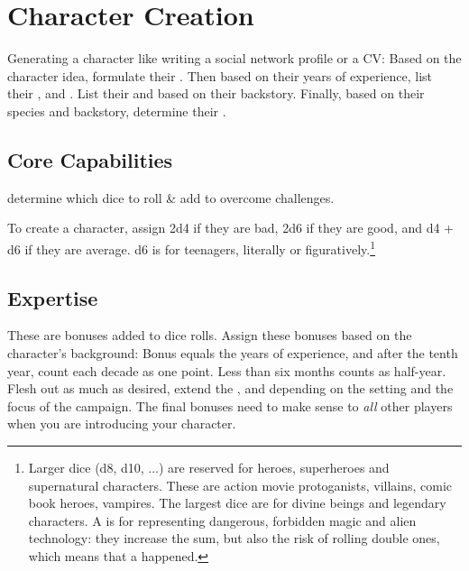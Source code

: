 \documentclass{LegrandOrangeTufteBook}
\begin{document}
\chapterspaceabove{2.75cm}
\chapterspacebelow{5.25cm}


\chapter*{Character Creation}

Generating a character like writing a social network profile or a CV: Based on the character idea, formulate their .
Then based on their years of experience, list their ,  and .
List their  and  based on their backstory.
Finally, based on their species and backstory, determine their .

\section*{Core Capabilities}

 determine which dice to roll \& add to overcome challenges.


To create a  character,
\marginpar{
	\footnotesize
	
}
assign 2d4 if they are bad,
2d6 if they are good, and d4 + d6 if they are average.
d6 is for teenagers, literally or figuratively.\footnote{
 	Larger dice (d8, d10, ...) are reserved for heroes, superheroes and supernatural characters.
 	These are action movie protoganists, villains, comic book heroes, vampires.
 	The largest dice are for divine beings and legendary characters.
 	A  is for representing dangerous, forbidden magic and alien technology:
 	they increase the sum, but also the risk of rolling double ones, which means that a  happened.
}

\section*{Expertise}

These are bonuses added to dice rolls. Assign these bonuses based on the character's background: Bonus equals the years of experience, and after the tenth year, count each decade as one point. Less than six months counts as half-year. Flesh out as much as desired, extend the ,  and  depending on the setting and the focus of the campaign. The final bonuses need to make sense to \emph{all} other players when you are introducing your character.\\
\end{document}
